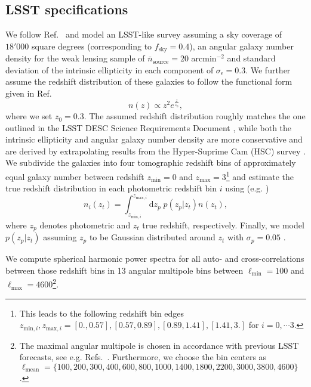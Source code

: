 \documentclass[%
 reprint,
nofootinbib,
 amsmath,amssymb,
 aps,
]{revtex4-1}
\begin{document}
\subsection{LSST specifications}
We follow Ref.~\cite{Madhavacheril:2017} and model an LSST-like survey assuming a sky coverage of $18'000$ square degrees (corresponding to $f_{\mathrm{sky}}=0.4$), an angular galaxy number density for the weak lensing sample of $\bar{n}_{\mathrm{source}} = 20$ arcmin$^{-2}$ and standard deviation of the intrinsic ellipticity in each component of $\sigma_{\epsilon} = 0.3$. We further assume the redshift distribution of these galaxies to follow the functional form given in Ref.~\cite{Smail:1994}
\begin{equation}
n(z) \propto z^{2} e^{\frac{z}{z_{0}}},
\end{equation}
where we set $z_{0} = 0.3$. The assumed redshift distribution roughly matches the one outlined in the LSST DESC Science Requirements Document \cite{LSST-SRD:2018}, while both the intrinsic ellipticity and angular galaxy number density are more conservative and are derived by extrapolating results from the Hyper-Suprime Cam (HSC) survey \cite{Aihara:2018}. We subdivide the galaxies into four tomographic redshift bins of approximately equal galaxy number between redshift $z_{\mathrm{min}}=0$ and $z_{\mathrm{max}}=3$\footnote{This leads to the following redshift bin edges $z_{\mathrm{min}, i}, z_{\mathrm{max}, i} = [0., 0.57], [0.57, 0.89], [0.89, 1.41], [1.41, 3.]$ for $i = 0, \cdots 3$.} and estimate the true redshift distribution in each photometric redshift bin $i$ using (e.g. \cite{Amara:2007})
\begin{equation}
n_{i}(z_{t}) = \int_{z_{\mathrm{min}, i}}^{z_{\mathrm{max}, i}} \mathrm{d} z_{p} \; p(z_{p}|z_{t}) n(z_{t}),
\end{equation}
where $z_{p}$ denotes photometric and $z_{t}$ true redshift, respectively. Finally, we model $p(z_{p}|z_{t})$ assuming $z_{p}$ to be Gaussian distributed around $z_{t}$ with $\sigma_{p} = 0.05$ \cite{Schaan:2017}.

We compute spherical harmonic power spectra for all auto- and cross-correlations between those redshift bins in 13 angular multipole bins between $\ell_{\mathrm{min}}=100$ and $\ell_{\mathrm{max}}=4600$\footnote{The maximal angular multipole is chosen in accordance with previous LSST forecasts, see e.g. Refs.~\cite{Krause:2017, Schaan:2017}. Furthermore, we choose the bin centers as $\ell_{\mathrm{mean}} = \{100, \allowbreak 200, \allowbreak 300, \allowbreak 400, \allowbreak 600, \allowbreak 800, \allowbreak 1000, \allowbreak 1400, \allowbreak 1800, \allowbreak 2200, \allowbreak 3000, \allowbreak 3800, \allowbreak 4600\}$.}.
\end{document}
